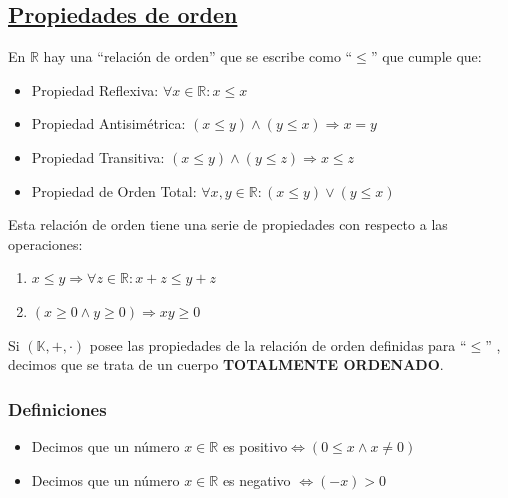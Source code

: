 \documentclass[10pt,a4paper,openright]{book}
\begin{document}
\subsection*{\underline {Propiedades de orden}}
En $\mathbb R$ hay una ``relación de orden'' que se escribe como ``$\leq$'' que cumple que:
\begin{itemize}
\item Propiedad Reflexiva: $\forall x\in  \mathbb R: x \leq x$
\item Propiedad Antisimétrica: $(x\leq y) \wedge (y\leq x) \Rightarrow x=y$
\item Propiedad Transitiva: $(x\leq y) \wedge (y \leq z) \Rightarrow x\leq z$
\item Propiedad de Orden Total: $\forall x,y\in \mathbb R: (x\leq y) \vee (y\leq x)$
\end{itemize}
Esta relación de orden tiene una serie de propiedades con respecto a las operaciones:
\begin{enumerate}
\item $x\leq y \Rightarrow \forall z \in \mathbb R : x+z\leq y+z$
\item $(x\geq 0 \wedge y \geq 0)\Rightarrow xy\geq 0$
\end{enumerate}

Si $(\mathbb K, +, \cdot)$ posee las propiedades de la relación de orden definidas para ``$\leq$'' , decimos que se trata de un cuerpo \textbf{TOTALMENTE ORDENADO}.

\subsubsection*{Definiciones}
\begin{itemize}
\item Decimos que un número $x\in \mathbb R$ es positivo$\Leftrightarrow (0\leq x \wedge x\neq 0)$
\item Decimos que un número $x\in \mathbb R$ es negativo $\Leftrightarrow (-x)>0$
\end{itemize}
\end{document}
